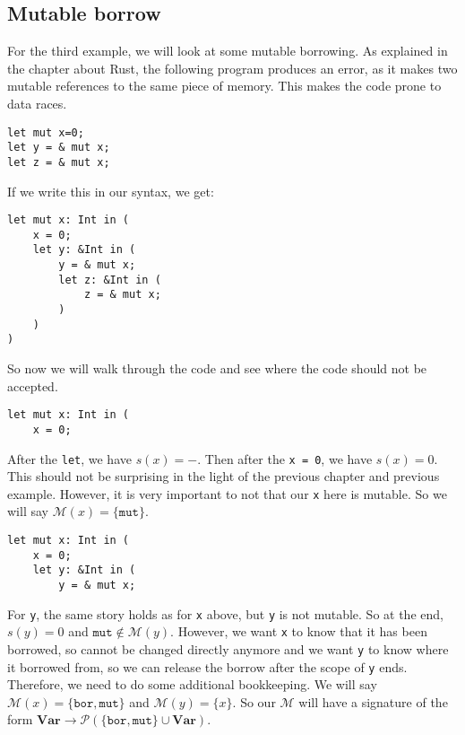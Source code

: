 \subsection{Mutable borrow}

For the third example, we will look at some mutable borrowing. As explained in the chapter about Rust, the following program produces an error, as it makes two mutable references to the same piece of memory. This makes the code prone to data races. 

\begin{verbatim}
let mut x=0;
let y = & mut x; 
let z = & mut x;
\end{verbatim}

If we write this in our syntax, we get: 

\begin{verbatim}
let mut x: Int in (
    x = 0;
    let y: &Int in (
        y = & mut x;
        let z: &Int in (
            z = & mut x;
        )
    )
)
\end{verbatim} 

So now we will walk through the code and see where the code should not be accepted. 

\begin{verbatim}
let mut x: Int in (
    x = 0;
\end{verbatim}

After the \texttt{let}, we have $s(x) = -$. Then after the \texttt{x = 0}, we have $s(x) = 0$. This should not be surprising in the light of the previous chapter and previous example. However, it is very important to not that our \texttt{x} here is mutable. So we will say $\mathcal{M}(x) = \{\texttt{mut}\}$. 

\begin{verbatim}
let mut x: Int in (
    x = 0;
    let y: &Int in (
        y = & mut x;
\end{verbatim}

For \texttt{y}, the same story holds as for \texttt{x} above, but \texttt{y} is not mutable. So at the end, $s(y) = 0$ and $\texttt{mut} \not \in \mathcal{M}(y)$. However, we want \texttt{x} to know that it has been borrowed, so cannot be changed directly anymore and we want \texttt{y} to know where it borrowed from, so we can release the borrow after the scope of \texttt{y} ends. Therefore, we need to do some additional bookkeeping. We will say $\mathcal{M}(x) = \{\texttt{bor}, \texttt{mut}\}$ and $\mathcal{M}(y) = \{x\}$. So our $\mathcal{M}$ will have a signature of the form $\textbf{Var} \to \mathcal{P}(\{\texttt{bor}, \texttt{mut}\} \cup \textbf{Var})$.

